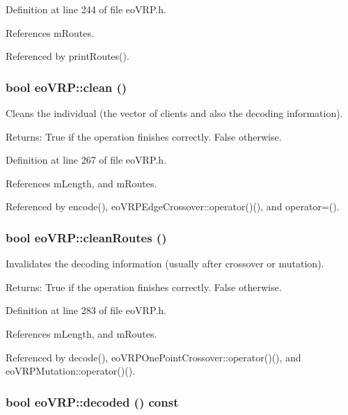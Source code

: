 Definition at line 244 of file eo\-VRP.h.

References m\-Routes.

Referenced by print\-Routes().
\subsubsection{\setlength{\rightskip}{0pt plus 5cm}bool eo\-VRP::clean ()\hspace{0.3cm}{\tt  [inline]}}\label{classeo_v_r_p_1c53a7a42174c7d40db92da644b25fec}


Cleans the individual (the vector of clients and also the decoding information). 

\begin{Desc}
\item[Returns:]True if the operation finishes correctly. False otherwise. \end{Desc}


Definition at line 267 of file eo\-VRP.h.

References m\-Length, and m\-Routes.

Referenced by encode(), eo\-VRPEdge\-Crossover::operator()(), and operator=().
\subsubsection{\setlength{\rightskip}{0pt plus 5cm}bool eo\-VRP::clean\-Routes ()\hspace{0.3cm}{\tt  [inline]}}\label{classeo_v_r_p_66fb699c1d34cac859406ad450be406a}


Invalidates the decoding information (usually after crossover or mutation). 

\begin{Desc}
\item[Returns:]True if the operation finishes correctly. False otherwise. \end{Desc}


Definition at line 283 of file eo\-VRP.h.

References m\-Length, and m\-Routes.

Referenced by decode(), eo\-VRPOne\-Point\-Crossover::operator()(), and eo\-VRPMutation::operator()().
\subsubsection{\setlength{\rightskip}{0pt plus 5cm}bool eo\-VRP::decoded () const\hspace{0.3cm}{\tt  [inline]}}\label{classeo_v_r_p_e188fadc91b4ee256e144ac86ee80a40}


